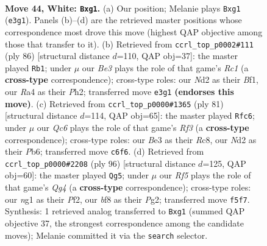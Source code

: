 \documentclass[11pt]{article}
\begin{document}
\clearpage

\begin{figure}[p]\centering
\begin{subfigure}{0.46\textwidth}\centering
\resizebox{\linewidth}{!}{%
\newchessgame
\chessboard[
  setfen={1r3b1k/1r3p2/2Q5/1n2pR2/R3P3/3KB3/3N2N1/6nq w - - 12 44},
  showmover=false,
  pgfstyle=straightmove, color=movearrow, markmove={e3-g1}
]}
\caption{}
\end{subfigure}\hfill
\begin{subfigure}{0.46\textwidth}\centering
\resizebox{\linewidth}{!}{%
\newchessgame
\chessboard[
  setfen={2r2b1k/6p1/4Q2p/3p4/8/2qN4/2n3PP/2R2BK1 w - - 1 44},
  showmover=false,
  pgfstyle=straightmove, color=movearrow, markmove={c1-b1}
]}
\caption{}
\end{subfigure}
\\[4pt]
\begin{subfigure}{0.46\textwidth}\centering
\resizebox{\linewidth}{!}{%
\newchessgame
\chessboard[
  setfen={2r3k1/6p1/1p3rNq/3n1PR1/4p3/1P2P3/P5Q1/4R1K1 b - - 6 41},
  showmover=false,
  pgfstyle=straightmove, color=movearrow, markmove={f6-c6}
]}
\caption{}
\end{subfigure}\hfill
\begin{subfigure}{0.46\textwidth}\centering
\resizebox{\linewidth}{!}{%
\newchessgame
\chessboard[
  setfen={2qn2k1/3r2b1/3RpB2/p3P3/6Q1/8/5PP1/6K1 w - - 5 49},
  showmover=false,
  pgfstyle=straightmove, color=movearrow, markmove={g4-g5}
]}
\caption{}
\end{subfigure}
\caption{\textbf{Move 44, White: \texttt{Bxg1}.} (a) Our position; Melanie plays \texttt{Bxg1} (\texttt{e3g1}). Panels (b)--(d) are the retrieved master positions whose correspondence most drove this move (highest QAP objective among those that transfer to it). (b) Retrieved from \texttt{ccrl\_top\_p0002\#111} (ply 86) [structural distance $d$=110, QAP obj=37]: the master played \texttt{Rb1}; under $\mu$ our \emph{Be3} plays the role of that game's \emph{Rc1} (a \textbf{cross-type} correspondence); cross-type roles: our \emph{N}d2 as their \emph{B}f1, our \emph{R}a4 as their \emph{P}h2; transferred move \texttt{e3g1} \textbf{(endorses this move)}. (c) Retrieved from \texttt{ccrl\_top\_p0000\#1365} (ply 81) [structural distance $d$=114, QAP obj=65]: the master played \texttt{Rfc6}; under $\mu$ our \emph{Qc6} plays the role of that game's \emph{Rf3} (a \textbf{cross-type} correspondence); cross-type roles: our \emph{B}e3 as their \emph{R}c8, our \emph{N}d2 as their \emph{P}b6; transferred move \texttt{c6f6}. (d) Retrieved from \texttt{ccrl\_top\_p0000\#2208} (ply 96) [structural distance $d$=125, QAP obj=60]: the master played \texttt{Qg5}; under $\mu$ our \emph{Rf5} plays the role of that game's \emph{Qg4} (a \textbf{cross-type} correspondence); cross-type roles: our \emph{n}g1 as their \emph{P}f2, our \emph{b}f8 as their \emph{P}g2; transferred move \texttt{f5f7}. Synthesis: 1 retrieved analog transferred to \texttt{Bxg1} (summed QAP objective 37, the strongest correspondence among the candidate moves); Melanie committed it via the \texttt{search} selector.}
\label{fig:thought-m86}
\end{figure}
\end{document}
